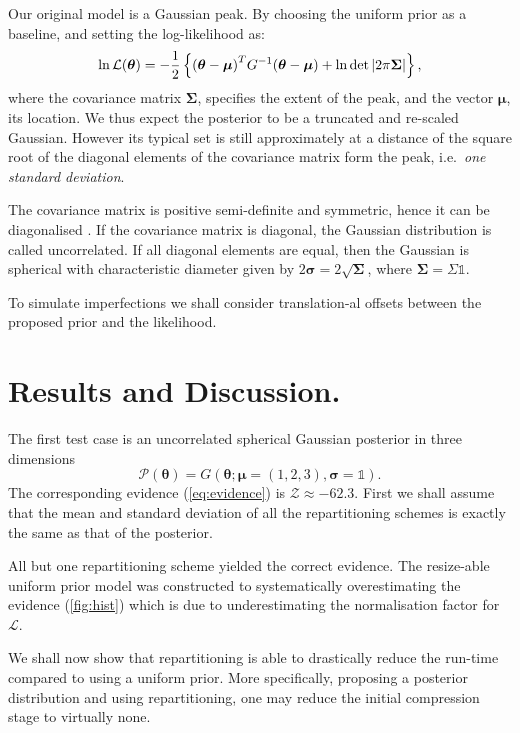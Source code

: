 \documentclass[usenatbib]{mnras}
\begin{document}
Our original model is a Gaussian peak. By choosing the uniform prior
as a baseline, and setting the log-likelihood as:
\begin{equation}
  \ln {\cal L}(\bm{\theta}) = - \dfrac{1}{2} \left\{{(\bm{\theta} - \bm{\mu})}^{T}G^{-1}(\bm{\theta}-\bm{\mu})  + \ln \det \left| 2\mathrm{\pi} \bm{\Sigma}\right| \right\},
\end{equation}
where the covariance matrix \(\bm{\Sigma}\), specifies the extent of
the peak, and the vector \(\bm{\mu}\), its location. We thus expect
the posterior to be a truncated and re-scaled Gaussian. However its
typical set is still approximately at a distance of the square root of
the diagonal elements of the covariance matrix form the peak,
i.e.~\emph{one standard deviation}.

The covariance matrix is positive semi-definite and symmetric, hence
it can be diagonalised \citep{taboga2017lectures}. If the covariance
matrix is diagonal, the Gaussian distribution is called
uncorrelated. If all diagonal elements are equal, then the Gaussian is
spherical with characteristic diameter given by
\(2\bm{\sigma} = 2\sqrt{\bm{\Sigma}}\), where \(\bm{\Sigma} = \Sigma \mathds{1}\).

To simulate imperfections we shall consider translation-al offsets
between the proposed prior and the likelihood.

\section{Results and Discussion.}\label{sec:results}
The first test case is an uncorrelated spherical Gaussian posterior
in three dimensions \[\mathcal{P}(\bm{\theta}) = G(\bm{\theta}; \bm{\mu} =
  (1,2,3),\bm{\sigma} = \mathds{1}).\] The corresponding evidence
(\cref{eq:evidence}) is \(\mathcal{Z}\approx-62.3\). First we shall
assume that the mean and standard deviation of all the
repartitioning schemes is exactly the same as that of the
posterior.

All but one repartitioning scheme yielded the correct evidence. The
resize-able uniform prior model was constructed to systematically
overestimating the evidence (\cref{fig:hist}) which is due to
underestimating the normalisation factor for
\(\mathcal{L}\).


We shall now show that repartitioning is able to drastically reduce
the run-time compared to using a uniform prior. More specifically,
proposing a posterior distribution and using repartitioning, one may
reduce the initial compression stage to virtually none.
\end{document}

